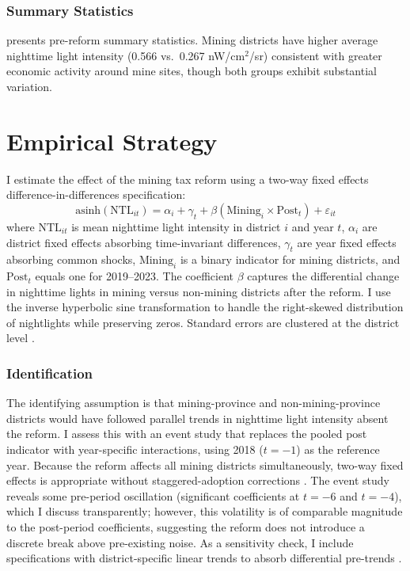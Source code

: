 \documentclass[12pt]{article}
\begin{document}
\subsubsection*{Summary Statistics}  presents pre-reform summary statistics. Mining districts have higher average nighttime light intensity (0.566 vs.\ 0.267 nW/cm$^2$/sr) consistent with greater economic activity around mine sites, though both groups exhibit substantial variation.



\section{Empirical Strategy}
\label{sec:strategy}

I estimate the effect of the mining tax reform using a two-way fixed effects difference-in-differences specification:
\begin{equation}
\text{asinh}(\text{NTL}_{it}) = \alpha_i + \gamma_t + \beta(\text{Mining}_i \times \text{Post}_t) + \varepsilon_{it}
\label{eq:did}
\end{equation}
where $\text{NTL}_{it}$ is mean nighttime light intensity in district $i$ and year $t$, $\alpha_i$ are district fixed effects absorbing time-invariant differences, $\gamma_t$ are year fixed effects absorbing common shocks, $\text{Mining}_i$ is a binary indicator for mining districts, and $\text{Post}_t$ equals one for 2019--2023. The coefficient $\beta$ captures the differential change in nighttime lights in mining versus non-mining districts after the reform. I use the inverse hyperbolic sine transformation to handle the right-skewed distribution of nightlights while preserving zeros. Standard errors are clustered at the district level \citep{cameron2008bootstrap}.

\subsubsection*{Identification} The identifying assumption is that mining-province and non-mining-province districts would have followed parallel trends in nighttime light intensity absent the reform. I assess this with an event study that replaces the pooled post indicator with year-specific interactions, using 2018 ($t = -1$) as the reference year. Because the reform affects all mining districts simultaneously, two-way fixed effects is appropriate without staggered-adoption corrections \citep{callaway2021difference}. The event study reveals some pre-period oscillation (significant coefficients at $t = -6$ and $t = -4$), which I discuss transparently; however, this volatility is of comparable magnitude to the post-period coefficients, suggesting the reform does not introduce a discrete break above pre-existing noise. As a sensitivity check, I include specifications with district-specific linear trends to absorb differential pre-trends \citep{rambachan2023honest}.
\end{document}
